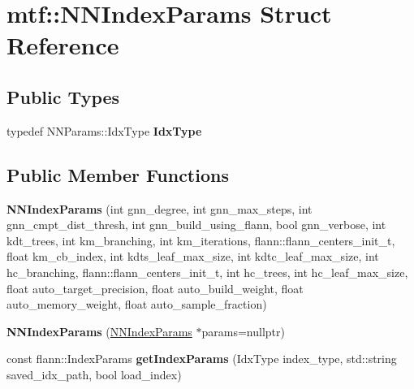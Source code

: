 \hypertarget{structmtf_1_1NNIndexParams}{\section{mtf\-:\-:N\-N\-Index\-Params Struct Reference}
\label{structmtf_1_1NNIndexParams}
}
\subsection*{Public Types}
\begin{DoxyCompactItemize}
\item 
\hypertarget{structmtf_1_1NNIndexParams_a1a54a5154fbb59c6ade206e55d9822ed}{typedef N\-N\-Params\-::\-Idx\-Type {\bfseries Idx\-Type}}\label{structmtf_1_1NNIndexParams_a1a54a5154fbb59c6ade206e55d9822ed}

\end{DoxyCompactItemize}
\subsection*{Public Member Functions}
\begin{DoxyCompactItemize}
\item 
\hypertarget{structmtf_1_1NNIndexParams_a8b87c4ee9e5c0e71c8cee7fd0d24de75}{{\bfseries N\-N\-Index\-Params} (int gnn\-\_\-degree, int gnn\-\_\-max\-\_\-steps, int gnn\-\_\-cmpt\-\_\-dist\-\_\-thresh, int gnn\-\_\-build\-\_\-using\-\_\-flann, bool gnn\-\_\-verbose, int kdt\-\_\-trees, int km\-\_\-branching, int km\-\_\-iterations, flann\-::flann\-\_\-centers\-\_\-init\-\_\-t, float km\-\_\-cb\-\_\-index, int kdts\-\_\-leaf\-\_\-max\-\_\-size, int kdtc\-\_\-leaf\-\_\-max\-\_\-size, int hc\-\_\-branching, flann\-::flann\-\_\-centers\-\_\-init\-\_\-t, int hc\-\_\-trees, int hc\-\_\-leaf\-\_\-max\-\_\-size, float auto\-\_\-target\-\_\-precision, float auto\-\_\-build\-\_\-weight, float auto\-\_\-memory\-\_\-weight, float auto\-\_\-sample\-\_\-fraction)}\label{structmtf_1_1NNIndexParams_a8b87c4ee9e5c0e71c8cee7fd0d24de75}

\item 
\hypertarget{structmtf_1_1NNIndexParams_af5a898b3949a2338a91b8d9fe4c2970b}{{\bfseries N\-N\-Index\-Params} (\hyperlink{structmtf_1_1NNIndexParams}{N\-N\-Index\-Params} $\ast$params=nullptr)}\label{structmtf_1_1NNIndexParams_af5a898b3949a2338a91b8d9fe4c2970b}

\item 
\hypertarget{structmtf_1_1NNIndexParams_a1c7591074b4ecc839d958dffe234c195}{const flann\-::\-Index\-Params {\bfseries get\-Index\-Params} (Idx\-Type index\-\_\-type, std\-::string saved\-\_\-idx\-\_\-path, bool load\-\_\-index)}\label{structmtf_1_1NNIndexParams_a1c7591074b4ecc839d958dffe234c195}

\end{DoxyCompactItemize}

